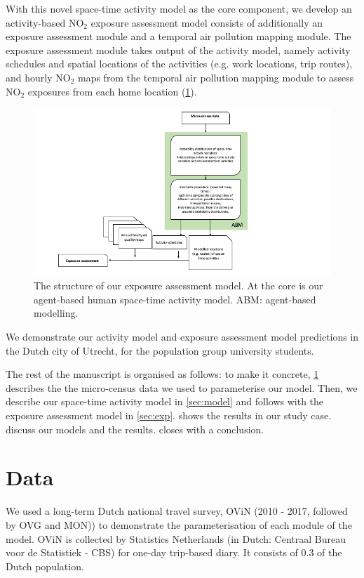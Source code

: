 \documentclass[]{article}
\begin{document}
With this novel space-time activity model as the core component, we develop an activity-based NO$_2$ exposure assessment model consists of additionally an exposure assessment module and a temporal air pollution mapping module. The exposure assessment module takes output of the activity model, namely activity schedules and spatial locations of the activities (e.g. work locations, trip routes), and hourly NO$_2$ maps from the temporal air pollution mapping module to assess NO$_2$ exposures from each home location (\cref{fig:expflow}).     

\begin{figure}
    \centering
    \includegraphics[width=\linewidth]{figure/exposureflow.png}
    \caption{The structure of our exposure assessment model. At the core is our agent-based human space-time activity model. ABM: agent-based modelling. }
    \label{fig:expflow}
\end{figure}
We demonstrate our activity model and exposure assessment model predictions in the Dutch city of Utrecht, for the population group university students.  

The rest of the manuscript is organised as follows: to make it concrete,  \cref{sec:data} describes the the micro-census data we used to parameterise our model. Then, we describe our space-time activity model in \cref{sec:model} and follows with the exposure assessment model in \cref{sec:exp}.  shows the results in our study case.  discuss our models and the results.  closes with a conclusion.

\section{Data}
\label{sec:data} 
We used a long-term Dutch national travel survey, OViN (2010 - 2017, followed by OVG and MON)) to demonstrate the parameterisation of each module of the model. OViN is collected by Statistics Netherlands (in Dutch: Centraal Bureau voor de Statistiek - CBS) for one-day trip-based diary. It consists of 0.3 of the Dutch population. 
\end{document}
